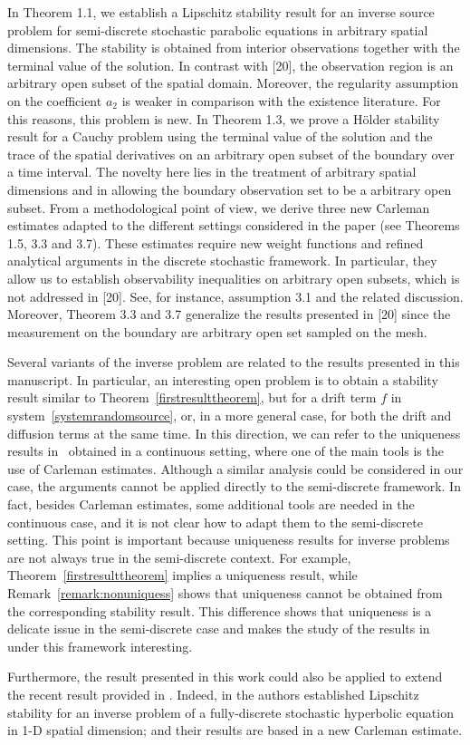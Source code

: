 \documentclass[11pt,oneside,leqno]{amsart}
\numberwithin{equation}{section}
\numberwithin{equation}{section}
\begin{document}
{ 
In Theorem 1.1, we establish a Lipschitz stability result for an inverse source problem for semi-discrete stochastic parabolic equations in arbitrary spatial dimensions. The stability is obtained from interior observations together with the terminal value of the solution. In contrast with [20], the observation region is an arbitrary open subset of the spatial domain. Moreover, the regularity assumption on the coefficient $a_2$ is weaker in comparison with the existence literature. For this reasons, this problem is new. In Theorem 1.3, we prove a Hölder stability result for a Cauchy problem using the terminal value of the solution and the trace of the spatial derivatives on an arbitrary open subset of the boundary over a time interval. The novelty here lies in the treatment of arbitrary spatial dimensions and in allowing the boundary observation set to be a arbitrary open subset. From a methodological point of view, we derive three new Carleman estimates adapted to the different settings considered in the paper (see Theorems 1.5, 3.3 and 3.7). These estimates require new weight functions and refined analytical arguments in the discrete stochastic framework. In particular, they allow us to establish observability inequalities on arbitrary open subsets, which is not addressed in [20]. See, for instance, assumption 3.1 and the related discussion. Moreover, Theorem 3.3 and 3.7 generalize the results presented in [20] since the measurement on the boundary are arbitrary open set sampled on the mesh. 

Several variants of the inverse problem are related to the results presented in this manuscript. In particular, an interesting open problem is to obtain a stability result similar to Theorem~\ref{firstresulttheorem}, but for a drift term $f$ in system~\ref{systemrandomsource}, or, in a more general case, for both the drift and diffusion terms at the same time. In this direction, we can refer to the uniqueness results in~\cite{LZ:2024,QLu:2012} obtained in a continuous setting, where one of the main tools is the use of Carleman estimates. Although a similar analysis could be considered in our case, the arguments cannot be applied directly to the semi-discrete framework. In fact, besides Carleman estimates, some additional tools are needed in the continuous case, and it is not clear how to adapt them to the semi-discrete setting. This point is important because uniqueness results for inverse problems are not always true in the semi-discrete context. For example, Theorem~\ref{firstresulttheorem} implies a uniqueness result, while Remark~\ref{remark:nonuniquess} shows that uniqueness cannot be obtained from the corresponding stability result. This difference shows that uniqueness is a delicate issue in the semi-discrete case and makes the study of the results in~\cite{LZ:2024,QLu:2012} under this framework interesting.

Furthermore, the result presented in this work could also be applied to extend the recent result provided in \cite{WZZW:2025}. Indeed, in \cite{WZZW:2025} the authors established Lipschitz stability for an inverse problem of a fully-discrete stochastic hyperbolic equation in 1-D spatial dimension; and their results are based in a new Carleman estimate. 
}
\end{document}
